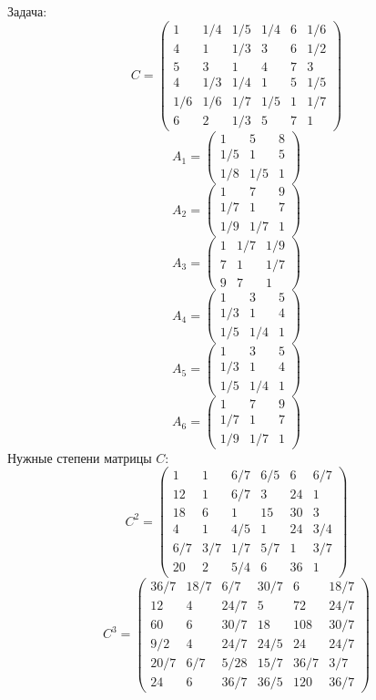 Задача:
$$C= \begin{pmatrix}
1 & 1/4 & 1/5 & 1/4 & 6 & 1/6\\
4 & 1 & 1/3 & 3 & 6 & 1/2\\
5 & 3 & 1 & 4 & 7 & 3\\
4 & 1/3 & 1/4 & 1 & 5 & 1/5\\
1/6 & 1/6 & 1/7 & 1/5 & 1 & 1/7\\
6 & 2 & 1/3 & 5 & 7 & 1
\end{pmatrix}
$$
$$A_1= \begin{pmatrix}
1 & 5 & 8\\
1/5 & 1 & 5\\
1/8 & 1/5 & 1
\end{pmatrix}
$$
$$A_2= \begin{pmatrix}
1 & 7 & 9\\
1/7 & 1 & 7\\
1/9 & 1/7 & 1
\end{pmatrix}
$$
$$A_3= \begin{pmatrix}
1 & 1/7 & 1/9\\
7 & 1 & 1/7\\
9 & 7 & 1
\end{pmatrix}
$$
$$A_4= \begin{pmatrix}
1 & 3 & 5\\
1/3 & 1 & 4\\
1/5 & 1/4 & 1
\end{pmatrix}
$$
$$A_5= \begin{pmatrix}
1 & 3 & 5\\
1/3 & 1 & 4\\
1/5 & 1/4 & 1
\end{pmatrix}
$$
$$A_6= \begin{pmatrix}
1 & 7 & 9\\
1/7 & 1 & 7\\
1/9 & 1/7 & 1
\end{pmatrix}
$$
Нужные степени матрицы $C$:
$$C^2 = \begin{pmatrix}
1 & 1 & 6/7 & 6/5 & 6 & 6/7\\
12 & 1 & 6/7 & 3 & 24 & 1\\
18 & 6 & 1 & 15 & 30 & 3\\
4 & 1 & 4/5 & 1 & 24 & 3/4\\
6/7 & 3/7 & 1/7 & 5/7 & 1 & 3/7\\
20 & 2 & 5/4 & 6 & 36 & 1
\end{pmatrix}
$$
$$C^3 = \begin{pmatrix}
36/7 & 18/7 & 6/7 & 30/7 & 6 & 18/7\\
12 & 4 & 24/7 & 5 & 72 & 24/7\\
60 & 6 & 30/7 & 18 & 108 & 30/7\\
9/2 & 4 & 24/7 & 24/5 & 24 & 24/7\\
20/7 & 6/7 & 5/28 & 15/7 & 36/7 & 3/7\\
24 & 6 & 36/7 & 36/5 & 120 & 36/7
\end{pmatrix}
$$
